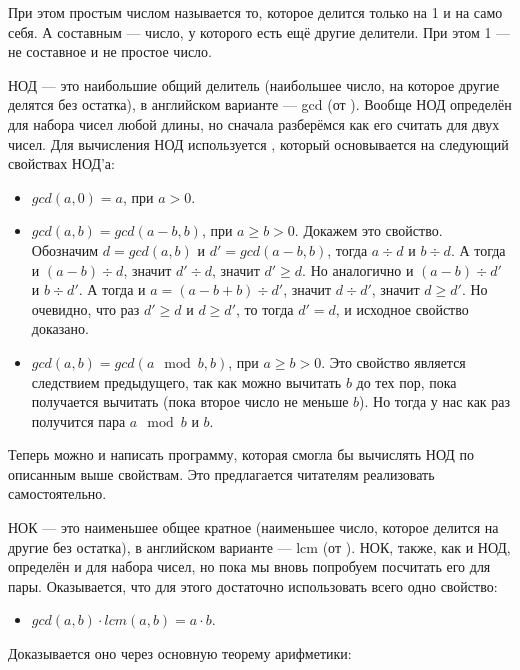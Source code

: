 При этом простым числом называется то, которое делится только на 1 и на само себя. А составным — число, у которого есть ещё другие делители. При этом 1 — не составное и не простое число.


НОД — это наибольшие общий делитель (наибольшее число, на которое другие делятся без остатка), в английском варианте — gcd (от ). Вообще НОД определён для набора чисел любой длины, но сначала разберёмся как его считать для двух чисел. Для вычисления НОД используется , который основывается на следующий свойствах НОД'а:

\begin{itemize}
    \item $gcd(a, 0) = a$, при $a > 0$.
    \item $gcd(a, b) = gcd(a - b, b)$, при $a \geq b > 0$. Докажем это свойство. Обозначим $d = gcd(a, b)$ и $d' = gcd(a - b, b)$, тогда $a \div d$ и $b \div d$. А тогда и $(a - b) \div d$, значит $d' \div d$, значит $d' \geq d$. Но аналогично и $(a - b) \div d'$ и $b \div d'$. А тогда и $a = (a - b + b) \div d'$, значит $d \div d'$, значит $d \geq d'$. Но очевидно, что раз $d' \geq d$ и $d \geq d'$, то тогда $d' = d$, и исходное свойство доказано.
    \item $gcd(a, b) = gcd(a \mod b, b)$, при $a \geq b > 0$. Это свойство является следствием предыдущего, так как можно вычитать $b$ до тех пор, пока получается вычитать (пока второе число не меньше $b$). Но тогда у нас как раз получится пара $a \mod b$ и $b$.
\end{itemize}

Теперь можно и написать программу, которая смогла бы вычислять НОД по описанным выше свойствам. Это предлагается читателям реализовать самостоятельно.

НОК — это наименьшее общее кратное (наименьшее число, которое делится на другие без остатка), в английском варианте — lcm (от ). НОК, также, как и НОД, определён и для набора чисел, но пока мы вновь попробуем посчитать его для пары. Оказывается, что для этого достаточно использовать всего одно свойство:

\begin{itemize}
    \item $gcd(a, b) \cdot lcm(a, b) = a \cdot b$.
\end{itemize}

Доказывается оно через основную теорему арифметики:

